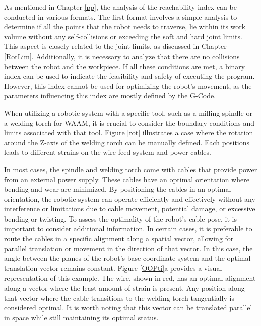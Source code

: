 \documentclass[conference]{IEEEtran}
\begin{document}
As mentioned in Chapter \ref{pp}, the analysis of the reachability index can be conducted in various formats. The first format involves a simple analysis to determine if all the points that the robot needs to traverse, lie within its work volume without any self-collisions or exceeding the soft and hard joint limits. This aspect is closely related to the joint limits, as discussed in Chapter \ref{RotLim}. Additionally, it is necessary to analyze that there are no collisions between the robot and the workpiece. If all these conditions are met, a binary index can be used to indicate the feasibility and safety of executing the program. However, this index cannot be used for optimizing the robot's movement, as the parameters influencing this index are mostly defined by the G-Code.

When utilizing a robotic system with a specific tool, such as a milling spindle or a welding torch for WAAM, it is crucial to consider the boundary conditions and limits associated with that tool. Figure \ref{rot} illustrates a case where the rotation around the Z-axis of the welding torch can be manually defined. Each positions leads to different strains on the wire-feed system and power-cables.



In most cases, the spindle and welding torch come with cables that provide power from an external power supply. These cables have an optimal orientation where bending and wear are minimized. By positioning the cables in an optimal orientation, the robotic system can operate efficiently and effectively without any interference or limitations due to cable movement, potential damage, or excessive bending or twisting. To assess the optimality of the robot's cable pose, it is important to consider additional information. In certain cases, it is preferable to route the cables in a specific alignment along a spatial vector, allowing for parallel translation or movement in the direction of that vector. In this case, the angle between the planes of the robot's base coordinate system and the optimal translation vector remains constant. Figure \ref{OOPti}a provides a visual representation of this example. The wire, shown in red, has an optimal alignment along a vector where the least amount of strain is present. Any position along that vector where the cable transitions to the welding torch tangentially is considered optimal. It is worth noting that this vector can be translated parallel in space while still maintaining its optimal status.
\end{document}
